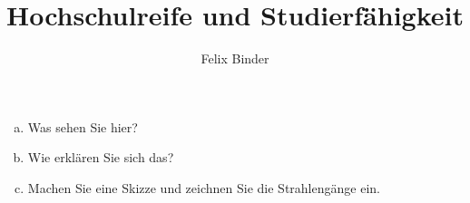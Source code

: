 \documentclass{beamer}%
\title{Hochschulreife und Studierfähigkeit}
\author[Felix Binder]{Felix Binder}
\begin{document}

\begin{frame}
	\begin{center}%
	\end{center}%
\begin{enumerate} [a)]
\item Was sehen Sie hier?
\item Wie erklären Sie sich das?
\item Machen Sie eine Skizze und zeichnen Sie die Strahlengänge ein.
\end{enumerate}%
\end{frame}
\end{document}
